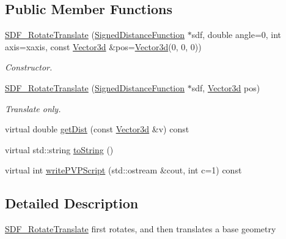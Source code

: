 \subsection*{Public Member Functions}
\begin{DoxyCompactItemize}
\item 
\hyperlink{classCPlantBox_1_1SDF__RotateTranslate_a09b206a3e20d62974bb764521072ec3c}{S\+D\+F\+\_\+\+Rotate\+Translate} (\hyperlink{classCPlantBox_1_1SignedDistanceFunction}{Signed\+Distance\+Function} $\ast$sdf, double angle=0, int axis=xaxis, const \hyperlink{classCPlantBox_1_1Vector3d}{Vector3d} \&pos=\hyperlink{classCPlantBox_1_1Vector3d}{Vector3d}(0, 0, 0))
\begin{DoxyCompactList}\small\item\em Constructor. \end{DoxyCompactList}\item 
\mbox{\label{classCPlantBox_1_1SDF__RotateTranslate_aceeeeffaa7084bbc0fe52f68f38ef0a1}} 
\hyperlink{classCPlantBox_1_1SDF__RotateTranslate_aceeeeffaa7084bbc0fe52f68f38ef0a1}{S\+D\+F\+\_\+\+Rotate\+Translate} (\hyperlink{classCPlantBox_1_1SignedDistanceFunction}{Signed\+Distance\+Function} $\ast$sdf, \hyperlink{classCPlantBox_1_1Vector3d}{Vector3d} pos)
\begin{DoxyCompactList}\small\item\em Translate only. \end{DoxyCompactList}\item 
virtual double \hyperlink{classCPlantBox_1_1SDF__RotateTranslate_aa28e32386597198bb1d74361b284c1f5}{get\+Dist} (const \hyperlink{classCPlantBox_1_1Vector3d}{Vector3d} \&v) const
\item 
virtual std\+::string \hyperlink{classCPlantBox_1_1SDF__RotateTranslate_aff09310a5f6e7fb009c442b786bcd45c}{to\+String} ()
\item 
virtual int \hyperlink{classCPlantBox_1_1SDF__RotateTranslate_ace433edd29e6ff91c9513ca3ccb12f88}{write\+P\+V\+P\+Script} (std\+::ostream \&cout, int c=1) const
\end{DoxyCompactItemize}


\subsection{Detailed Description}
\hyperlink{classCPlantBox_1_1SDF__RotateTranslate}{S\+D\+F\+\_\+\+Rotate\+Translate} first rotates, and then translates a base geometry 

